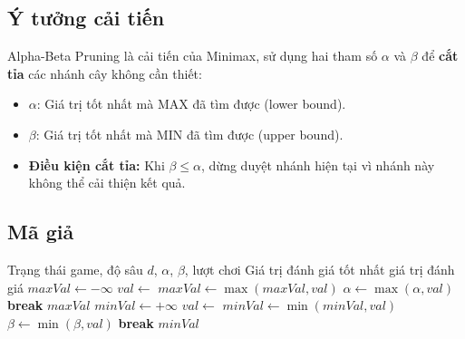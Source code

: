 \documentclass[12pt,a4paper]{article}
\begin{document}
\subsection{Ý tưởng cải tiến}

Alpha-Beta Pruning là cải tiến của Minimax, sử dụng hai tham số $\alpha$ và $\beta$ để \textbf{cắt tỉa} các nhánh cây không cần thiết:

\begin{itemize}
    \item $\alpha$: Giá trị tốt nhất mà MAX đã tìm được (lower bound).
    \item $\beta$: Giá trị tốt nhất mà MIN đã tìm được (upper bound).
    \item \textbf{Điều kiện cắt tỉa:} Khi $\beta \leq \alpha$, dừng duyệt nhánh hiện tại vì nhánh này không thể cải thiện kết quả.
\end{itemize}

\subsection{Mã giả}

\begin{algorithm}[H]
\caption{Thuật toán Alpha-Beta Pruning}
\begin{algorithmic}[1]
\Require Trạng thái game, độ sâu $d$, $\alpha$, $\beta$, lượt chơi
\Ensure Giá trị đánh giá tốt nhất
        \State \Return giá trị đánh giá
    \EndIf
        \State $maxVal \gets -\infty$
            \State $val \gets$ 
            \State $maxVal \gets \max(maxVal, val)$
            \State $\alpha \gets \max(\alpha, val)$
            \If{$\beta \leq \alpha$} 
                \State \textbf{break}
            \EndIf
        \EndFor
        \State \Return $maxVal$
    \Else
        \State $minVal \gets +\infty$
            \State $val \gets$ 
            \State $minVal \gets \min(minVal, val)$
            \State $\beta \gets \min(\beta, val)$
            \If{$\beta \leq \alpha$} 
                \State \textbf{break}
            \EndIf
        \EndFor
        \State \Return $minVal$
    \EndIf
\EndFunction
\end{algorithmic}
\end{algorithm}
\end{document}

